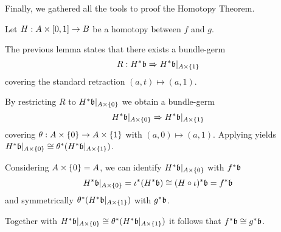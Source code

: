 \begin{myparagraph}
    Finally, we gathered all the tools to proof the Homotopy Theorem.
\end{myparagraph}

\begin{myproof}
    Let $H: A \times{} [0, 1] \to B$ be a homotopy between $f$ and $g$.

    The previous lemma states that there exists a bundle-germ
    \[ R: H^*\mathfrak{b} \Rightarrow{} H^*\mathfrak{b}\vert_{A \times{} \{1\}} \]
    covering the standard retraction $(a, t) \mapsto (a, 1)$.

    By restricting $R$ to $H^*\mathfrak{b}\vert_{A \times{} \{0\}}$ we obtain a bundle-germ
    \[ H^*\mathfrak{b}\vert_{A \times{} \{0\}} \Rightarrow{} H^*\mathfrak{b}\vert_{A \times{} \{1\}} \]
    covering $\theta: A \times{} \{0\} \to A \times{} \{1\}$ with $(a, 0) \mapsto (a, 1)$.
    Applying  yields $H^*\mathfrak{b}\vert_{A \times{} \{0\}} \cong \theta^*(H^*\mathfrak{b}\vert_{A \times{} \{1\}})$.

    Considering $A \times{} \{0\} = A$, we can identify $H^*\mathfrak{b}\vert_{A \times{} \{0\}}$ with $f^*\mathfrak{b}$
    \[ H^*\mathfrak{b}\vert_{A \times \{0\}} = \iota^*(H^*\mathfrak{b}) \cong (H \circ \iota)^*\mathfrak{b} = f^*\mathfrak{b} \]
    and symmetrically $\theta^*(H^*\mathfrak{b}\vert_{A \times{} \{1\}})$ with $g^*\mathfrak{b}$.

    Together with $H^*\mathfrak{b}\vert_{A \times{} \{0\}} \cong \theta^*(H^*\mathfrak{b}\vert_{A \times{} \{1\}})$
    it follows that $f^*\mathfrak{b} \cong g^*\mathfrak{b}$.
\end{myproof}